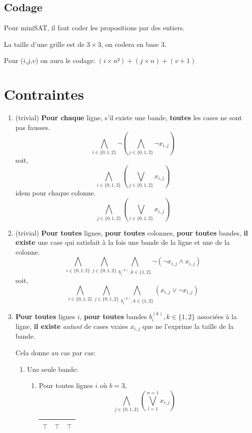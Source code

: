 \documentclass[a4paper,12pt]{report}
\begin{document}
\subsection{Codage}
Pour miniSAT, il faut coder les propositions par des entiers.


La taille d'une grille est de $3\times3$, on codera en base 3.


Pour ($i$,$j$,$v$) on aura le codage: $(i \times n²)+(j \times n)+(v+1)$


\section{Contraintes}
\begin{enumerate}

\item (trivial) \textbf{Pour chaque} ligne, s'il existe une bande, \textbf{toutes} les cases ne sont pas fausses.
$$ \bigwedge_{i \in \{0,1,2\}} \lnot \left( \bigwedge_{j \in \{0,1,2\}} \lnot x_{i,j} \right) $$
soit,
$$ \bigwedge_{i \in \{0,1,2\}} \left( \bigvee_{j \in \{0,1,2\}} x_{i,j} \right) $$
idem pour chaque colonne.
$$ \bigwedge_{j \in \{0,1,2\}} \left( \bigvee_{i \in \{0,1,2\}} x_{i,j} \right) $$

\item (trivial) \textbf{Pour toutes} lignes, \textbf{pour toutes} colonnes, \textbf{pour toutes} bandes, \textbf{il existe} une case qui satisfait à la fois une bande de la ligne et une de la colonne.
$$\bigwedge_{i \in \{0,1,2\}} \bigwedge_{j \in \{0,1,2\}} \bigwedge_{b_i^{(k)}, k\in\{1,2\}} 
\lnot \left(
	\lnot x_{i,j} \wedge x_{i,j}
\right)$$
soit,
$$\bigwedge_{i \in \{0,1,2\}} \bigwedge_{j \in \{0,1,2\}} \bigwedge_{b_i^{(k)}, k\in\{1,2\}} 
\left(
	x_{i,j} \vee \lnot x_{i,j}
\right)$$

\item \textbf{Pour toutes} lignes $i$, \textbf{pour toutes} bandes $b_i^{(k)}, k\in\{1,2\}$ associées à la ligne, \textbf{il existe} \textit{autant} de cases vraies $x_{i,j}$ que ne l'exprime la taille de la bande. 

Cela donne au cas par cas:
	\begin{enumerate}
		\item Une seule bande: 
		\begin{enumerate}
			\item Pour toutes lignes $i$ où $b=3$, 
			$$\bigwedge_{j\in\{0,1,2\}}\left( \bigvee_{l=1}^{n=1} x_{i,j} \right)$$
			\begin{center}						
			\begin{tabular}{|c|c|c|}
			\hline 
			$\top$ & $\top$  & $\top$  \\ 
			\hline  
			\end{tabular}
			\end{center}


\end{enumerate}
\end{enumerate}
\end{enumerate}
\end{document}
